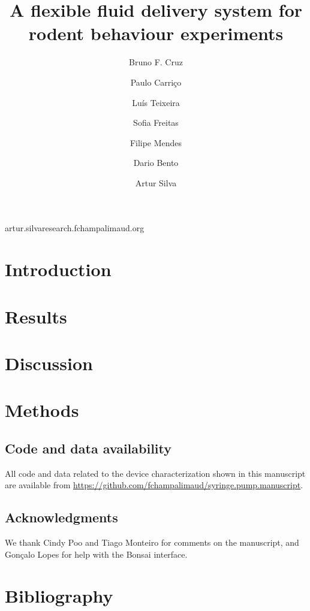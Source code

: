 
\title{A flexible fluid delivery system for rodent behaviour experiments}
\shorttitle{}

\author[1,2,3]{Bruno F. Cruz}
\author[1]{Paulo Carriço}
\author[1]{Luís Teixeira}
\author[1]{Sofia Freitas}
\author[1]{Filipe Mendes}
\author[1]{Dario Bento}
\author[1,\Letter]{Artur Silva}
\date{}

\maketitle

\begin{abstract}


\end{abstract}


\begin{corrauthor}
artur.silva\at research.fchampalimaud.org
\end{corrauthor}

\section*{Introduction}\label{s:introduction}


\section*{Results}\label{s:results}


\section*{Discussion}\label{s:discussion}


\section*{Methods}\label{s:methods}


\subsection*{Code and data availability}
All code and data related to the device characterization shown in this manuscript are available from \url{https://github.com/fchampalimaud/syringe.pump.manuscript}.

\subsection*{Acknowledgments}\label{s:Acknowledgments}
We thank Cindy Poo and Tiago Monteiro for comments on the manuscript, and Gonçalo Lopes for help with the Bonsai interface.

\section*{Bibliography}



